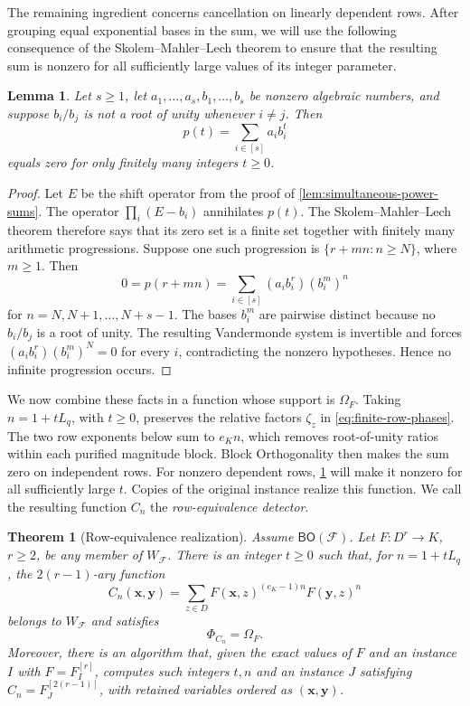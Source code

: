 \documentclass[11pt,letterpaper,onecolumn]{article}
\theoremstyle{plain}
\newtheorem{theorem}{Theorem}[section]
\newtheorem{lemma}[lemma]{Lemma}
\theoremstyle{definition}
\theoremstyle{remark}
\newcommand{\cF}{\mathcal F}
\newcommand{\BO}{\mathsf{BO}}
\newcommand{\SuppRel}[1]{\Phi_{#1}}
\newcommand{\RowEq}[1]{\Omega_{#1}}
\begin{document}
The remaining ingredient concerns cancellation on linearly dependent
rows.  After grouping equal exponential bases in the sum, we will use
the following consequence of the Skolem--Mahler--Lech theorem to ensure
that the resulting sum is nonzero for all sufficiently large values of
its integer parameter.

\begin{lemma}
\label{lem:nondegenerate-exponential-sums}
Let $s\ge1$, let $a_1,\ldots,a_s,b_1,\ldots,b_s$ be nonzero algebraic
numbers, and
suppose $b_i/b_j$ is not a root of unity whenever $i\ne j$.  Then
\[
  p(t)=\sum_{i\in[s]} a_ib_i^t
\]
equals zero for only finitely many integers $t\ge0$.
\end{lemma}

\begin{proof}
Let $E$ be the shift operator from the proof of
\cref{lem:simultaneous-power-sums}.  The operator $\prod_i(E-b_i)$
annihilates $p(t)$.  The Skolem--Mahler--Lech theorem
therefore says that
its zero set is a finite set together with finitely many arithmetic
progressions.  Suppose one such progression is
$\{r+mn:n\ge N\}$, where $m\ge1$.  Then
\[
  0=p(r+mn)=\sum_{i\in[s]}(a_i b_i^r)(b_i^m)^n
\]
for $n=N,N+1,\ldots,N+s-1$.  The bases $b_i^m$ are pairwise distinct because
no $b_i/b_j$ is a root of unity.  The resulting Vandermonde system is
invertible and forces
$(a_i b_i^r)(b_i^m)^N=0$ for every $i$, contradicting the nonzero hypotheses.
Hence no infinite progression occurs.
\end{proof}

We now combine these facts in a function whose support is $\RowEq F$.
Taking $n=1+tL_q$, with $t\ge0$, preserves the relative factors
$\zeta_z$ in \eqref{eq:finite-row-phases}.  The two row exponents below
sum to $e_Kn$, which removes root-of-unity ratios within each purified
magnitude block.  Block Orthogonality then makes the sum zero on
independent rows.  For nonzero dependent rows,
\cref{lem:nondegenerate-exponential-sums} will make it nonzero for all
sufficiently large $t$.  Copies of the original instance realize this
function.  We call the resulting function $C_n$ the
\emph{row-equivalence detector}.

\begin{theorem}[Row-equivalence realization]
\label{thm:omega-support-realization}
Assume $\BO(\cF)$.  Let $F:D^r\to K$, $r\ge2$, be any member of
$W_{\cF}$.  There is an integer $t\ge0$ such that, for $n=1+tL_q$, the
$2(r-1)$-ary function
\begin{equation}
  C_n(\mathbf x,\mathbf y)
  =\sum_{z\in D}
       F(\mathbf x,z)^{(e_K-1)n}F(\mathbf y,z)^n
  \label{eq:omega-detector}
\end{equation}
belongs to $W_{\cF}$ and satisfies
\begin{equation}
  \SuppRel{C_n}=\RowEq F.
  \label{eq:omega-is-support}
\end{equation}
Moreover, there is an algorithm that, given the exact values of $F$ and
an instance $I$ with $F=F_I^{[r]}$, computes such integers $t,n$ and an
instance $J$ satisfying $C_n=F_J^{[2(r-1)]}$, with retained variables
ordered as $(\mathbf x,\mathbf y)$.
\end{theorem}
\end{document}
